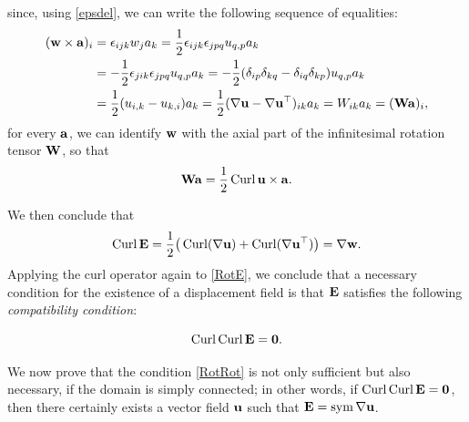 since, using \eqref{epsdel}, we can write the following sequence of equalities:
\begin{equation}
	\begin{aligned}
		(\mathbf{w} \times \mathbf{a})_i &= \epsilon_{ijk} w_j a_k = \frac{1}{2} \epsilon_{ijk} \epsilon_{jpq} u_{q,p} a_k \\
		&= -\frac{1}{2} \epsilon_{jik} \epsilon_{jpq} u_{q,p} a_k = -\frac{1}{2} (\delta_{ip} \delta_{kq} - \delta_{iq} \delta_{kp}) u_{q,p} a_k \\
		&= \frac{1}{2} (u_{i,k} - u_{k,i}) a_k = \frac{1}{2} (\nabla \mathbf{u} - \nabla \mathbf{u}^\top)_{ik} a_k = W_{ik} a_k = (\mathbf{W} \mathbf{a})_i,
	\end{aligned}
\end{equation}
for every \(\mathbf{a}\), we can identify \(\mathbf{w}\) with the axial part of the infinitesimal rotation tensor \(\mathbf{W}\), so that
\begin{equation}
	\mathbf{W} \mathbf{a} = \frac{1}{2} \operatorname{Curl} \mathbf{u} \times \mathbf{a}.
\end{equation}

We then conclude that
\begin{equation}
	\operatorname{Curl} \mathbf{E} = \frac{1}{2} \big( \operatorname{Curl} (\nabla \mathbf{u}) + \operatorname{Curl} (\nabla \mathbf{u}^\top) \big) = \nabla \mathbf{w}.
\end{equation}
Applying the curl operator again to \eqref{RotE}, we conclude that a necessary condition for the existence of a displacement field is that \(\mathbf{E}\) satisfies the following \textit{compatibility condition}:
\begin{definition}
	\begin{equation}\label{RotRot}
		\operatorname{Curl} \operatorname{Curl} \mathbf{E} = \mathbf{0}.
	\end{equation}
\end{definition}

We now prove that the condition \eqref{RotRot} is not only sufficient but also necessary, if the domain is simply connected; in other words, if \(\operatorname{Curl} \operatorname{Curl} \mathbf{E} = \mathbf{0}\), then there certainly exists a vector field \(\mathbf{u}\) such that \(\mathbf{E} = \operatorname{sym} \nabla \mathbf{u}\).

